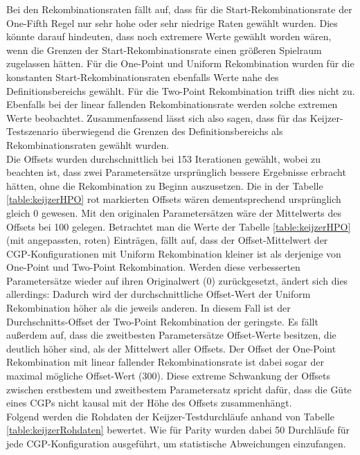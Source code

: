 Bei den Rekombinationsraten fällt auf, dass für die Start-Rekombinationsrate der One-Fifth Regel nur sehr hohe oder sehr niedrige Raten gewählt wurden.
Dies könnte darauf hindeuten, dass noch extremere Werte gewählt worden wären, wenn die Grenzen der Start-Rekombinationsrate einen größeren Spielraum zugelassen hätten.
Für die One-Point und Uniform Rekombination wurden für die konstanten Start-Rekombinationsraten ebenfalls Werte nahe des Definitionsbereichs gewählt.
Für die Two-Point Rekombination trifft dies nicht zu.
Ebenfalls bei der linear fallenden Rekombinationsrate werden solche extremen Werte beobachtet.
Zusammenfassend lässt sich also sagen, dass für das Keijzer-Testszenario überwiegend die Grenzen des Definitionsbereichs als Rekombinationsraten gewählt wurden.\\
Die Offsets wurden durchschnittlich bei 153 Iterationen gewählt, wobei zu beachten ist, dass zwei Parametersätze ursprünglich bessere Ergebnisse erbracht hätten, ohne die Rekombination zu Beginn auszusetzen.
Die in der Tabelle \ref{table:keijzerHPO} rot markierten Offsets wären dementsprechend ursprünglich gleich 0 gewesen.
Mit den originalen Parametersätzen wäre der Mittelwerts des Offsets bei 100 gelegen.
Betrachtet man die Werte der Tabelle \ref{table:keijzerHPO} (mit angepassten, roten) Einträgen, fällt auf, dass der Offset-Mittelwert der CGP-Konfigurationen mit Uniform Rekombination kleiner ist als derjenige von One-Point und Two-Point Rekombination.
Werden diese verbesserten Parametersätze wieder auf ihren Originalwert (0) zurückgesetzt, ändert sich dies allerdings: Dadurch wird der durchschnittliche Offset-Wert der Uniform Rekombination höher als die jeweils anderen.
In diesem Fall ist der Durchschnitts-Offset der Two-Point Rekombination der geringste.
Es fällt außerdem auf, dass die zweitbesten Parametersätze Offset-Werte besitzen, die deutlich höher sind, als der Mittelwert aller Offsets.
Der Offset der One-Point Rekombination mit linear fallender Rekombinationsrate ist dabei sogar der maximal mögliche Offset-Wert (300).
Diese extreme Schwankung der Offsets zwischen erstbestem und zweitbestem Parametersatz spricht dafür, dass die Güte eines CGPs nicht kausal mit der Höhe des Offsets zusammenhängt.\\

Folgend werden die Rohdaten der Keijzer-Testdurchläufe anhand von Tabelle \ref{table:keijzerRohdaten} bewertet.
Wie für Parity wurden dabei 50 Durchläufe für jede CGP-Konfiguration ausgeführt, um statistische Abweichungen einzufangen.



